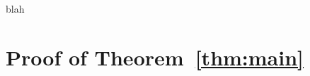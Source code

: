 \documentclass{article}
\begin{document}
\begin{theoremrep}
\label{thm:main}
blah
\end{theoremrep}
\makeatletter
\section{Proof of Theorem~\ref{thm:main}}
\end{document}
